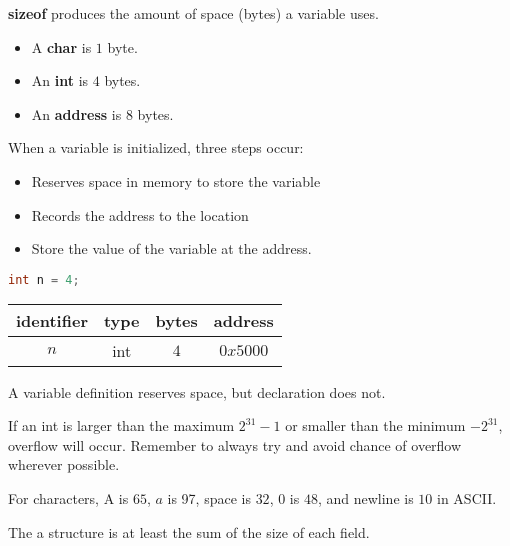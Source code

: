 \documentclass[english, 12pt]{article}
\begin{document}
\begin{defn}
\textbf{sizeof} produces the amount of space (bytes) a variable uses.
\begin{itemize}
\item A \textbf{char} is $1$ byte.
\item An \textbf{int} is $4$ bytes.
\item An \textbf{address} is $8$ bytes.
\end{itemize}
\end{defn}

\begin{note}
When a variable is initialized, three steps occur:
\begin{itemize}
\item Reserves space in memory to store the variable
\item Records the address to the location
\item Store the value of the variable at the address.
\end{itemize}
\begin{center}
\begin{lstlisting}[language=C]
int n = 4;
\end{lstlisting}
\begin{tabular}{|c|c|c|c|}
\hline
identifier & type & bytes & address \\
\hline
$n$ & int & $4$ & $0x5000$ \\
\hline
\end{tabular}
\end{center}
\end{note}
\begin{qte}
A variable definition reserves space, but declaration does not.
\end{qte}

\begin{note}
If an int is larger than the maximum $2^31 - 1$ or smaller than the minimum $- 2^31$, overflow will occur. Remember to always try and avoid chance of overflow wherever possible.
\end{note}

\begin{note}
For characters, A is $65$, $a$ is 97, space is $32$, $0$ is $48$, and newline is $10$ in ASCII.
\end{note}

\begin{note}
The  a structure is at least the sum of the size of each field.
\end{note}
\end{document}
